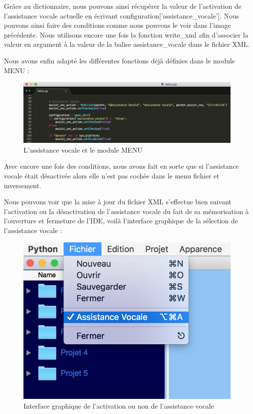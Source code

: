 \documentclass[a4paper,12pt]{article}
\begin{document}
Grâce au dictionnaire, nous pouvons ainsi récupérer la valeur de l'activation de l'assistance vocale actuelle en écrivant configuration['assistance\_vocale']. Nous pouvons ainsi faire des conditions comme nous pouvons le voir dans l'image précédente. Nous utilisons encore une fois la fonction write\_xml afin d'associer la valeur en argument à la valeur de la balise assistance\_vocale dans le fichier XML. 

\newpage

Nous avons enfin adapté les différentes fonctions déjà définies dans le module MENU : 


\begin{figure}[h!]
			\begin{center}
				\includegraphics[scale=0.45]{images/menu.png}
				\caption{L'assistance vocale et le module MENU}
			\end{center}
		\end{figure}
		
Avec encore une fois des conditions, nous avons fait en sorte que si l'assistance vocale était désactivée alors elle n'est pas cochée dans le menu fichier et inversement.

Nous pouvons voir que la mise à jour du fichier XML s'effectue bien suivant l'activation ou la désactivation de l'assistance vocale du fait de sa mémorisation à l'ouverture et fermeture de l'IDE, voilà l'interface graphique de la sélection de l'assistance vocale : 

\begin{figure}[h!]
			\begin{center}
				\includegraphics[scale=0.6]{images/assistance_vocale.png}
				\caption{Interface graphique de l'activation ou non de l'assistance vocale}
			\end{center}
		\end{figure}
		
\end{document}
